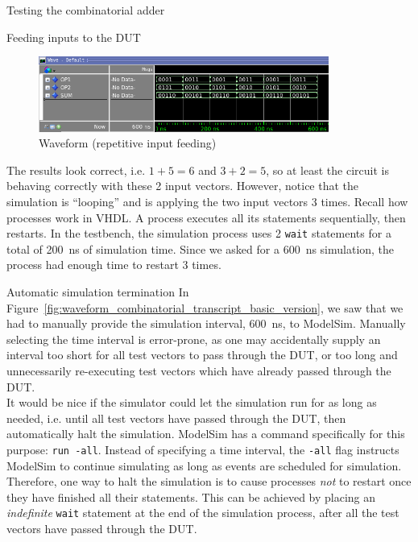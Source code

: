 \documentclass[lab]{course}
\begin{document}
\begin{section}{Testing the combinatorial adder}
\begin{subsection}{Feeding inputs to the DUT}
\begin{enumerate}
            \begin{figure}[!h]
                \begin{centering}
                    \includegraphics[width=0.85\textwidth]{figs/waveform_combinatorial_process_reexecutes.png}
                    \caption{Waveform (repetitive input feeding)}
                    \label{fig:waveform_combinatorial_process_reexecutes}
                \end{centering}
            \end{figure}

            The results look correct, i.e. $1 + 5 = 6$ and $3 + 2 = 5$, so at least the circuit is behaving correctly with these 2 input vectors. However, notice that the simulation is ``looping'' and is applying the two input vectors 3 times. Recall how processes work in VHDL. A process executes all its statements sequentially, then restarts. In the testbench, the simulation process uses 2 \verb+wait+ statements for a total of \SI{200}{\nano\second} of simulation time. Since we asked for a \SI{600}{\nano\second} simulation, the process had enough time to restart 3 times.
        \end{enumerate}

        \begin{subsubsection}{Automatic simulation termination}
            In Figure~\ref{fig:waveform_combinatorial_transcript_basic_version}, we saw that we had to manually provide the simulation interval, \SI{600}{\nano\second}, to ModelSim. Manually selecting the time interval is error-prone, as one may accidentally supply an interval too short for all test vectors to pass through the DUT, or too long and unnecessarily re-executing test vectors which have already passed through the DUT. \\

            It would be nice if the simulator could let the simulation run for as long as needed, i.e. until all test vectors have passed through the DUT, then automatically halt the simulation. ModelSim has a command specifically for this purpose: \verb+run -all+. Instead of specifying a time interval, the \verb+-all+ flag instructs ModelSim to continue simulating as long as events are scheduled for simulation. Therefore, one way to halt the simulation is to cause processes \emph{not} to restart once they have finished all their statements. This can be achieved by placing an \emph{indefinite} \verb+wait+ statement at the end of the simulation process, after all the test vectors have passed through the DUT.


\end{subsubsection}
\end{subsection}
\end{section}
\end{document}
